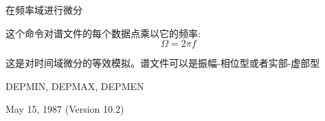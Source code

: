 \label{cmd:mulomega}

在频率域进行微分

这个命令对谱文件的每个数据点乘以它的频率:
\[ \Omega = 2 \pi f\]

这是对时间域微分的等效模拟。谱文件可以是振幅-相位型或者实部-虚部型

DEPMIN, DEPMAX, DEPMEN

May 15, 1987 (Version 10.2)
